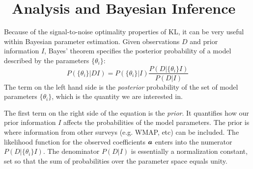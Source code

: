 \section{\KL\ Analysis and Bayesian Inference}
\label{sec:KL_bayes}
Because of the signal-to-noise optimality properties of KL, it can be
very useful within Bayesian parameter estimation.  
Given observations $D$ and prior information $I$, Bayes' theorem specifies the
posterior probability of a model described by the parameters $\{\theta_i\}$:
\begin{equation}
  \label{eq:bayes_chp2}
  P(\{\theta_i\}|DI) = P(\{\theta_i\}|I) \frac{P(D|\{\theta_i\}I)}{P(D|I)}
\end{equation}
The term on the left hand side
is the \textit{posterior} probability of the set of
model parameters $\{\theta_i\}$, which is the quantity we are interested in.

The first term on the right side of the equation is the \textit{prior}.
It quantifies how our prior
information $I$ affects the probabilities of the model parameters.  The 
prior is where information from other surveys (e.g. WMAP, etc) can be
included. The likelihood function for the observed coefficients $\boldsymbol{a}$
enters into the numerator $P(D|\{\theta_i\}I)$.  The denominator $P(D|I)$
is essentially a normalization constant, set so that the sum of probabilities
over the parameter space equals unity.

